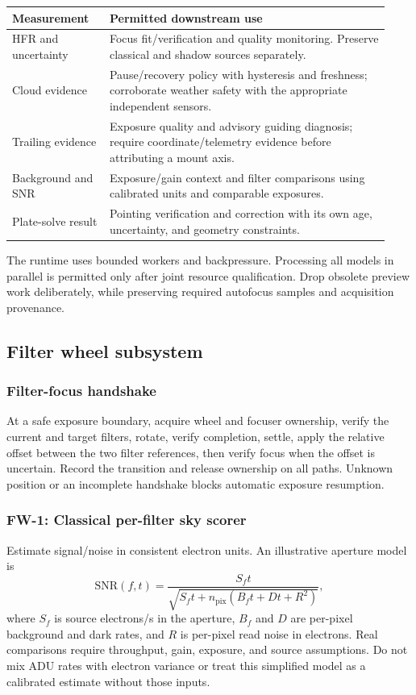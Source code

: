 \documentclass[11pt,a4paper]{article}
\begin{document}
\begin{longtable}{@{}L{0.24\linewidth}L{0.69\linewidth}@{}}
\toprule Measurement & Permitted downstream use\\\midrule\endhead
HFR and uncertainty & Focus fit/verification and quality monitoring. Preserve
classical and shadow sources separately.\\
Cloud evidence & Pause/recovery policy with hysteresis and freshness; corroborate
weather safety with the appropriate independent sensors.\\
Trailing evidence & Exposure quality and advisory guiding diagnosis; require
coordinate/telemetry evidence before attributing a mount axis.\\
Background and SNR & Exposure/gain context and filter comparisons using
calibrated units and comparable exposures.\\
Plate-solve result & Pointing verification and correction with its own age,
uncertainty, and geometry constraints.\\
\bottomrule
\end{longtable}
The runtime uses bounded workers and backpressure. Processing all models in
parallel is permitted only after joint resource qualification. Drop obsolete
preview work deliberately, while preserving required autofocus samples and
acquisition provenance.

\subsection{Filter wheel subsystem}
\subsubsection{Filter-focus handshake}
At a safe exposure boundary, acquire wheel and focuser ownership, verify the
current and target filters, rotate, verify completion, settle, apply the
relative offset between the two filter references, then verify focus when
the offset is uncertain. Record the transition and release ownership on all
paths. Unknown position or an incomplete handshake blocks automatic exposure
resumption.

\subsubsection{FW-1: Classical per-filter sky scorer}
Estimate signal/noise in consistent electron units. An illustrative aperture
model is
\[
\mathrm{SNR}(f,t)=\frac{S_f t}
 {\sqrt{S_f t+n_{\mathrm{pix}}(B_f t+D t+R^2)}} ,
\]
where $S_f$ is source electrons/s in the aperture, $B_f$ and $D$ are per-pixel
background and dark rates, and $R$ is per-pixel read noise in electrons.
Real comparisons require throughput, gain, exposure, and source assumptions.
Do not mix ADU rates with electron variance or treat this simplified model as
a calibrated estimate without those inputs.
\end{document}
